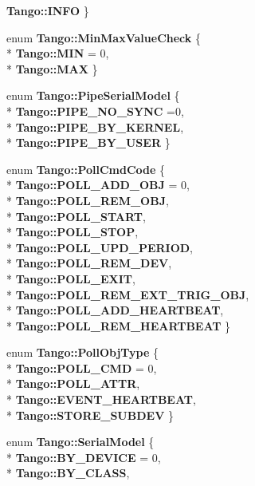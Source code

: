 \begin{DoxyCompactItemize}
{\bf Tango\-::\-I\-N\-F\-O}
 \}
\item 
enum {\bf Tango\-::\-Min\-Max\-Value\-Check} \{ \\*
{\bf Tango\-::\-M\-I\-N} = 0, 
\\*
{\bf Tango\-::\-M\-A\-X}
 \}
\item 
enum {\bf Tango\-::\-Pipe\-Serial\-Model} \{ \\*
{\bf Tango\-::\-P\-I\-P\-E\-\_\-\-N\-O\-\_\-\-S\-Y\-N\-C} =0, 
\\*
{\bf Tango\-::\-P\-I\-P\-E\-\_\-\-B\-Y\-\_\-\-K\-E\-R\-N\-E\-L}, 
\\*
{\bf Tango\-::\-P\-I\-P\-E\-\_\-\-B\-Y\-\_\-\-U\-S\-E\-R}
 \}
\item 
enum {\bf Tango\-::\-Poll\-Cmd\-Code} \{ \\*
{\bf Tango\-::\-P\-O\-L\-L\-\_\-\-A\-D\-D\-\_\-\-O\-B\-J} = 0, 
\\*
{\bf Tango\-::\-P\-O\-L\-L\-\_\-\-R\-E\-M\-\_\-\-O\-B\-J}, 
\\*
{\bf Tango\-::\-P\-O\-L\-L\-\_\-\-S\-T\-A\-R\-T}, 
\\*
{\bf Tango\-::\-P\-O\-L\-L\-\_\-\-S\-T\-O\-P}, 
\\*
{\bf Tango\-::\-P\-O\-L\-L\-\_\-\-U\-P\-D\-\_\-\-P\-E\-R\-I\-O\-D}, 
\\*
{\bf Tango\-::\-P\-O\-L\-L\-\_\-\-R\-E\-M\-\_\-\-D\-E\-V}, 
\\*
{\bf Tango\-::\-P\-O\-L\-L\-\_\-\-E\-X\-I\-T}, 
\\*
{\bf Tango\-::\-P\-O\-L\-L\-\_\-\-R\-E\-M\-\_\-\-E\-X\-T\-\_\-\-T\-R\-I\-G\-\_\-\-O\-B\-J}, 
\\*
{\bf Tango\-::\-P\-O\-L\-L\-\_\-\-A\-D\-D\-\_\-\-H\-E\-A\-R\-T\-B\-E\-A\-T}, 
\\*
{\bf Tango\-::\-P\-O\-L\-L\-\_\-\-R\-E\-M\-\_\-\-H\-E\-A\-R\-T\-B\-E\-A\-T}
 \}
\item 
enum {\bf Tango\-::\-Poll\-Obj\-Type} \{ \\*
{\bf Tango\-::\-P\-O\-L\-L\-\_\-\-C\-M\-D} = 0, 
\\*
{\bf Tango\-::\-P\-O\-L\-L\-\_\-\-A\-T\-T\-R}, 
\\*
{\bf Tango\-::\-E\-V\-E\-N\-T\-\_\-\-H\-E\-A\-R\-T\-B\-E\-A\-T}, 
\\*
{\bf Tango\-::\-S\-T\-O\-R\-E\-\_\-\-S\-U\-B\-D\-E\-V}
 \}
\item 
enum {\bf Tango\-::\-Serial\-Model} \{ \\*
{\bf Tango\-::\-B\-Y\-\_\-\-D\-E\-V\-I\-C\-E} = 0, 
\\*
{\bf Tango\-::\-B\-Y\-\_\-\-C\-L\-A\-S\-S}, 

\end{DoxyCompactItemize}
